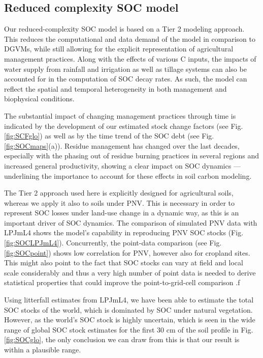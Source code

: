 \documentclass[gc, manuscript]{copernicus}
\begin{document}
\hypertarget{reduced-complexity-soc-model}{%
\subsection{Reduced complexity SOC model}\label{reduced-complexity-soc-model}}

Our reduced-complexity SOC model is based on a Tier 2 modeling approach. This reduces the computational and data demand of the model in comparison to DGVMs, while still allowing for the explicit representation of agricultural management practices. Along with the effects of various C inputs, the impacts of water supply from rainfall and irrigation as well as tillage systems can also be accounted for in the computation of SOC decay rates. As such, the model can reflect the spatial and temporal heterogeneity in both management and biophysical conditions.

The substantial impact of changing management practices through time is indicated by the development of our estimated stock change factors (see Fig. \ref{fig:SCFglo}) as well as by the time trend of the SOC debt (see Fig. \ref{fig:SOCmaps}(a)). Residue management has changed over the last decades, especially with the phasing out of residue burning practices in several regions and increased general productivity, showing a clear impact on SOC dynamics --- underlining the importance to account for these effects in soil carbon modeling.

The Tier 2 approach \citep{ogle_cropland_in_ipcc_2019} used here is explicitly designed for agricultural soils, whereas we apply it also to soils under PNV. This is necessary in order to represent SOC losses under land-use change in a dynamic way, as this is an important driver of SOC dynamics. The comparison of simulated PNV data with LPJmL4 shows the model's capability in reproducing PNV SOC stocks (Fig. \ref{fig:SOCLPJmL4}).
Concurrently, the point-data comparison (see Fig. \ref{fig:SOCpoint}) shows low correlation for PNV, however also for cropland sites. This might also point to the fact that SOC stocks can vary at field and local scale considerably and thus a very high number of point data is needed to derive statistical properties that could improve the point-to-grid-cell comparison \citep[see][]{rammig_generic_2018}.f

Using litterfall estimates from LPJmL4, we have been able to estimate the total SOC stocks of the world, which is dominated by SOC under natural vegetation. However, as the world's SOC stock is highly uncertain, which is seen in the wide range of global SOC stock estimates for the first 30 cm of the soil profile \citep{batjes_harmonized_2016, hengl_soilgrids250m_2017, fao_global_2018, schaphoff_lpjml4_2018-1, poggio_soilgrids_2021, sanderman_soil_2017} in Fig. \ref{fig:SOCglo}, the only conclusion we can draw from this is that our result is within a plausible range.
\end{document}

